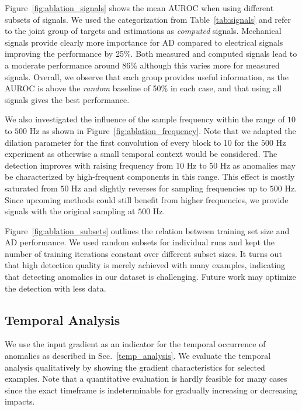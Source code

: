 \documentclass[journal]{IEEEtran}
\begin{document}
Figure~\ref{fig:ablation_signals} shows the mean AUROC when using different subsets of signals.
We used the categorization from Table~\ref{tab:signals} and refer to the joint group of targets and estimations as \textit{computed} signals.
Mechanical signals provide clearly more importance for AD compared to electrical signals improving the performance by 25\%.
Both measured and computed signals lead to a moderate performance around 86\% although this varies more for measured signals.
Overall, we observe that each group provides useful information, as the AUROC is above the \textit{random} baseline of 50\% in each case, and that using all signals gives the best performance.

We also investigated the influence of the sample frequency within the range of $10$ to $500$ Hz as shown in Figure~\ref{fig:ablation_frequency}.
{Note that we adapted the dilation parameter for the first convolution of every block to 10 for the $500$ Hz experiment as otherwise a small temporal context would be considered.}
The detection improves with raising frequency {from $10\text{ Hz}$ to $50\text{ Hz}$ as anomalies may be characterized by high-frequent components in this range}.
This effect is mostly saturated {from $50$ Hz and slightly reverses for sampling frequencies up to $500$ Hz.}
Since upcoming methods could still benefit from higher frequencies, we provide signals  with the original sampling at $500$ Hz.



Figure~\ref{fig:ablation_subsets} outlines the relation between training set size and AD performance.
We used random subsets for individual runs {and kept the number of training iterations constant over different subset sizes.}
It turns out that high detection quality is merely achieved with many examples, indicating that detecting anomalies in our dataset is challenging.
Future work may optimize the detection with less data.
\subsection{Temporal Analysis}
We use the input gradient as an indicator for the temporal occurrence of anomalies as described in Sec.~\ref{temp_analysis}.
We evaluate the temporal analysis qualitatively by showing the gradient characteristics for selected examples.
Note that a quantitative evaluation is hardly feasible for many cases since the exact timeframe is indeterminable for gradually increasing or decreasing impacts.
\end{document}
